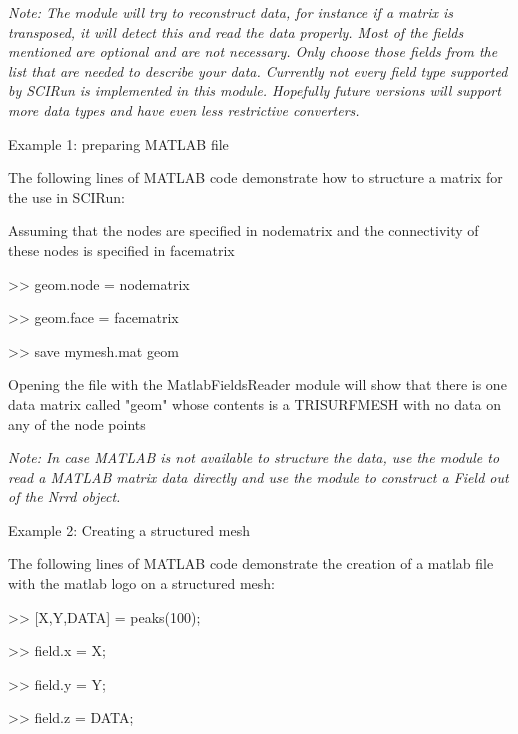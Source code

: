 {\slshape Note: 
	The module will try to reconstruct data, for instance if a matrix is transposed, it will detect this and read the data properly.
	Most of the fields mentioned are optional and are not necessary. Only choose those fields from the list that are needed to 
	describe your data. Currently not every field type supported by SCIRun is implemented in this module. Hopefully future versions
	will support more data types and have even less restrictive converters.
	}

 Example 1: preparing MATLAB file 

 The following lines of MATLAB code demonstrate how to structure a matrix for the use in SCIRun: 



Assuming that the nodes are specified in nodematrix and the connectivity of these nodes is specified in facematrix 



 \textgreater{}\textgreater{} geom.node = nodematrix 



 \textgreater{}\textgreater{} geom.face = facematrix 



 \textgreater{}\textgreater{} save mymesh.mat geom 



 Opening the file with the MatlabFieldsReader module will show that there is one data matrix called "geom" whose contents
	is a TRISURFMESH with no data on any of the node points 



{\slshape Note: 
	In case MATLAB is not available to structure the data, use the  module to read a MATLAB matrix data directly and
	use the  module to construct a Field out of the Nrrd object. 
	}

 Example 2: Creating a structured mesh 

 The following lines of MATLAB code demonstrate the creation of a matlab file with the matlab logo on a structured mesh: 



 \textgreater{}\textgreater{} [X,Y,DATA] = peaks(100); 



 \textgreater{}\textgreater{} field.x = X; 



 \textgreater{}\textgreater{} field.y = Y; 



 \textgreater{}\textgreater{} field.z = DATA; 



